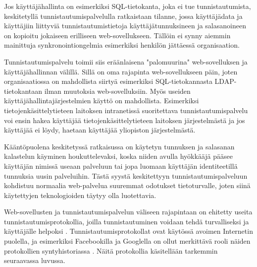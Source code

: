 Jos käyttäjähallinta on esimerkiksi SQL-tietokanta, joka ei tue tunnistautumista, keskitetyllä tunnistautumispalvelulla ratkaistaan tilanne, jossa käyttäjädata ja käyttäjiin liittyviä tunnistautumistietoja käyttäjätunnuksineen ja salasanoineen on kopioitu jokaiseen erilliseen web-sovellukseen. Tällöin ei synny aiemmin mainittuja synkronointiongelmia esimerkiksi henkilön jättäessä organisaation.

Tunnistautumispalvelu toimii siis eräänlaisena "palomuurina" web-sovelluksen ja käyttäjähallinnan välillä. Sillä on oma rajapinta web-sovellukseen päin, joten organisaatiossa on mahdollista siirtyä esimerkiksi SQL-tietokannasta LDAP-tietokantaan ilman muutoksia web-sovelluksiin. Myös useiden käyttäjähallintajärjestelmien käyttö on mahdollista. Esimerkiksi tietojenkäsittelytieteen laitoksen intranetissä suoritettava tunnistautumispalvelu voi ensin hakea käyttäjää tietojenkäsittelytieteen laitoksen järjestelmästä ja jos käyttäjää ei löydy, haetaan käyttäjää yliopiston järjestelmästä.

Kääntöpuolena keskitetyssä ratkaisussa on käytetyn tunnuksen ja salasanan kalastelun käyminen houkuttelevaksi, koska niiden avulla hyökkääjä pääsee käyttäjän nimissä useaan palveluun tai jopa luomaan käyttäjän identiteetillä tunnuksia uusin palveluihin. Tästä syystä keskitettyyn tunnistautumispalveluun kohdistuu normaalia web-palvelua suuremmat odotukset tietoturvalle, joten siinä käytettyjen teknologioiden täytyy olla luotettavia.

Web-sovellusten ja tunnistautumispalvelun väliseen rajapintaan on ehitetty useita tunnistautumisprotokollia, joilla tunnistautuminen voidaan tehdä turvalliseksi ja käyttäjälle helpoksi \cite{open_identity}. Tunnistautumisprotokollat ovat käytössä avoimen Internetin puolella, ja esimerkiksi Facebookilla ja Googlella on ollut merkittävä rooli näiden protokollien syntyhistoriassa \cite{open_identity}. Näitä protokollia käsitellään tarkemmin seuraavassa luvussa.